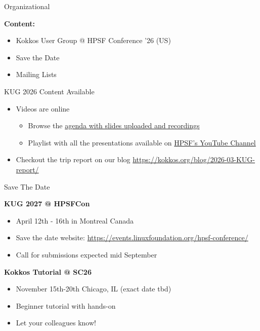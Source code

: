 

\begin{frame}[fragile]

  {\Huge Organizational}

  \vspace{15pt}

  \textbf{Content:}
  \begin{itemize}
    \item Kokkos User Group @ HPSF Conference '26 (US)
    \item Save the Date
    \item Mailing Lists
  \end{itemize}

\end{frame}


\begin{frame}[fragile]{KUG 2026 Content Available}


\begin{itemize}
\item Videos are online
  \begin{itemize}
  \item Browse the \href{https://hpsf2026.sched.com/overview/type/Kokkos+Project+Meeting}{agenda with slides uploaded and recordings}
  \item Playlist with all the presentations available on \href{https://youtube.com/playlist?list=PLRKq_yxxHw28Ttz9noQiGQglDlZhUFHJ4&si=v-O6KetKLGRQ4h7V}{HPSF's YouTube Channel}
  \end{itemize}
\item Checkout the trip report on our blog \url{https://kokkos.org/blog/2026-03-KUG-report/}
\end{itemize}

\end{frame}


\begin{frame}[fragile]{Save The Date}

\textbf{KUG 2027 @ HPSFCon}
\begin{itemize}
\item April 12th - 16th in Montreal Canada
\item Save the date website: \url{https://events.linuxfoundation.org/hpsf-conference/}
\item Call for submissions expected mid September
\end{itemize}

\vspace{5pt}
\textbf{Kokkos Tutorial @ SC26}
\begin{itemize}
\item November 15th-20th Chicago, IL (exact date tbd)
\item Beginner tutorial with hands-on
\item Let your colleagues know!
\end{itemize}
\end{frame}

